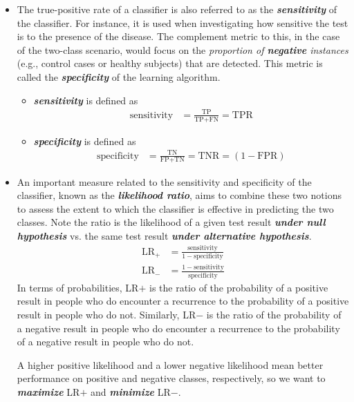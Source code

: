 \documentclass[11pt]{article}
\begin{document}
\begin{itemize}
\item The true-positive rate of a classifier is also referred to as the \textbf{\emph{sensitivity}} of the classifier. For instance, it is used when investigating how sensitive the test is to the presence of the disease. The complement metric to this, in the case of the two-class scenario, would focus on the \emph{proportion of \textbf{negative} instances} (e.g., control cases or healthy subjects) that are detected. This metric is called the \emph{\textbf{specificity}} of the learning algorithm. 
\begin{itemize}
\item \textbf{\emph{sensitivity}} is defined as
\begin{align}
\text{sensitivity} &=  \frac{\text{TP}}{\text{TP}+ \text{FN}} =\text{TPR} \label{eqn: sensitivity}
\end{align}

\item \textbf{\emph{specificity}} is defined as
\begin{align}
\text{specificity} &= \frac{\text{TN}}{\text{FP} + \text{TN}} = \text{TNR} = (1- \text{FPR}) \label{eqn: specificity}
\end{align}
\end{itemize}

\item An important measure related to the sensitivity and specificity of the classifier, known as the \emph{\textbf{likelihood ratio}}, aims to combine these two notions to assess the extent to which the classifier is effective in predicting the two classes. Note the ratio is the likelihood of a given test result \emph{\textbf{under null hypothesis}} vs. the same test result \textit{\textbf{under alternative hypothesis}}. 
\begin{align}
\text{LR}_{+} &= \frac{\text{sensitivity} }{1 - \text{specificity}} \label{eqn: likelihood_ratio_pos}\\
\text{LR}_{-} &= \frac{1 -\text{sensitivity} }{\text{specificity}} \label{eqn: likelihood_ratio_pos}
\end{align} In terms of probabilities, LR$+$ is the ratio of the probability of a positive result in people who do encounter a recurrence to the probability of a positive
result in people who do not. Similarly, LR$-$ is the ratio of the probability of a negative result in people who do encounter a recurrence to the probability of a negative result in people who do not. 

A higher positive likelihood and a lower negative likelihood mean better performance on positive and negative classes, respectively, so we want to \emph{\textbf{maximize}} LR$+$ and \emph{\textbf{minimize}} LR$-$. 



\end{itemize}
\end{document}
